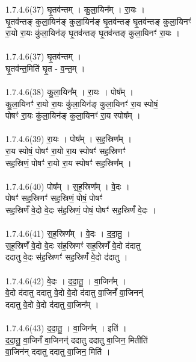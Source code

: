 \subsubsection{}
1.7.4.6(37)  घृ॒तव॑न्तम् । कु॒ला॒यिन᳚म् । रा॒यः ।\\
घृ॒तव॑न्तङ् कुला॒यिन॑ङ् कुला॒यिन॑ङ् घृ॒तव॑न्तङ् घृ॒तव॑न्तङ् कुला॒यिनꣳ॑\\
रा॒यो रा॒यः कु॑ला॒यिन॑ङ् घृ॒तव॑न्तङ् घृ॒तव॑न्तङ् कुला॒यिनꣳ॑ रा॒यः ।\\
\\
1.7.4.6(37)  घृ॒तव॑न्तम् ।\\
घृ॒तव॑न्त॒मिति॑ घृ॒त - व॒न्त॒म् ।\\
\\
1.7.4.6(38)  कु॒ला॒यिन᳚म् । रा॒यः । पोष᳚म् ।\\
कु॒ला॒यिनꣳ॑ रा॒यो रा॒यः कु॑ला॒यिन॑ङ् कुला॒यिनꣳ॑ रा॒य स्पोषं॒\\
पोषꣳ॑ रा॒यः कु॑ला॒यिन॑ङ् कुला॒यिनꣳ॑ रा॒य स्पोष᳚म् ।\\
\\
1.7.4.6(39)  रा॒यः । पोष᳚म् । स॒ह॒स्रिण᳚म् ।\\
रा॒य स्पोषं॒ पोषꣳ॑ रा॒यो रा॒य स्पोषꣳ॑ सह॒स्रिणꣳ॑\\
सह॒स्रिणं॒ पोषꣳ॑ रा॒यो रा॒य स्पोषꣳ॑ सह॒स्रिण᳚म् ।\\
\\
1.7.4.6(40)  पोष᳚म् । स॒ह॒स्रिण᳚म् । वे॒दः ।\\
पोषꣳ॑ सह॒स्रिणꣳ॑ सह॒स्रिणं॒ पोषं॒ पोषꣳ॑\\
सह॒स्रिणँ॑ वे॒दो वे॒दः स॑ह॒स्रिणं॒ पोषं॒ पोषꣳ॑ सह॒स्रिणँ॑ वे॒दः ।\\
\\
1.7.4.6(41)  स॒ह॒स्रिण᳚म् । वे॒दः । द॒दा॒तु॒ ।\\
स॒ह॒स्रिणँ॑ वे॒दो वे॒दः स॑ह॒स्रिणꣳ॑ सह॒स्रिणँ॑ वे॒दो द॑दातु\\
ददातु वे॒दः स॑ह॒स्रिणꣳ॑ सह॒स्रिणँ॑ वे॒दो द॑दातु ।\\
\\
1.7.4.6(42)  वे॒दः । द॒दा॒तु॒ । वा॒जिन᳚म् ।\\
वे॒दो द॑दातु ददातु वे॒दो वे॒दो द॑दातु वा॒जिनँ॑ वा॒जिनन्॑ \\
ददातु वे॒दो वे॒दो द॑दातु वा॒जिन᳚म् ।\\
\\
1.7.4.6(43)  द॒दा॒तु॒ । वा॒जिन᳚म् । इति॑ ।\\
द॒दा॒तु॒ वा॒जिनँ॑ वा॒जिनन्॑ ददातु ददातु वा॒जिन॒ मितीति॑\\
वा॒जिन॑न् ददातु ददातु वा॒जिन॒ मिति॑ ।\\
